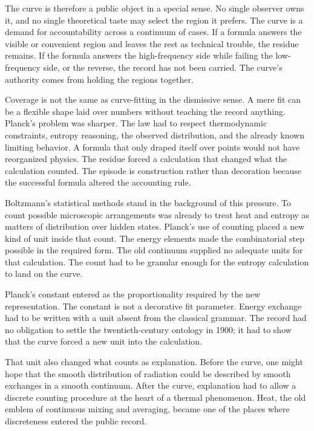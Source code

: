 The curve is therefore a public object in a special sense. No single
observer owns it, and no single theoretical taste may select the region
it prefers. The curve is a demand for accountability across a continuum of
cases. If a formula answers the visible or convenient region and leaves
the rest as technical trouble, the residue remains. If the formula
answers the high-frequency side while failing the low-frequency side, or
the reverse, the record has not been carried. The curve's authority comes
from holding the regions together.

Coverage is not the same as curve-fitting in the dismissive sense. A mere
fit can be a flexible shape laid over numbers without teaching the record
anything. Planck's problem was sharper. The law had to respect
thermodynamic constraints, entropy reasoning, the observed distribution,
and the already known limiting behavior. A formula that only draped
itself over points would not have reorganized physics. The residue
forced a calculation that changed what the calculation counted. The
episode is construction rather than decoration because the successful
formula altered the accounting rule.

Boltzmann's statistical methods stand in the background of this pressure.
To count possible microscopic arrangements was already to treat heat and
entropy as matters of distribution over hidden states. Planck's use of
counting placed a new kind of unit inside that count. The energy elements
made the combinatorial step possible in the required form. The old
continuum supplied no adequate units for that calculation. The count had to be
granular enough for the entropy calculation to land on the curve.

Planck's constant entered as the proportionality required by the new
representation. The constant is not a decorative fit parameter. Energy
exchange had to be written with a unit absent from the classical grammar.
The record had no obligation to settle the twentieth-century ontology in
1900; it had to show that the curve forced a new unit into the
calculation.

That unit also changed what counts as explanation. Before the curve, one
might hope that the smooth distribution of radiation could be described
by smooth exchanges in a smooth continuum. After the curve, explanation
had to allow a discrete counting procedure at the heart of a thermal
phenomenon. Heat, the old emblem of continuous mixing and averaging,
became one of the places where discreteness entered the public record.

